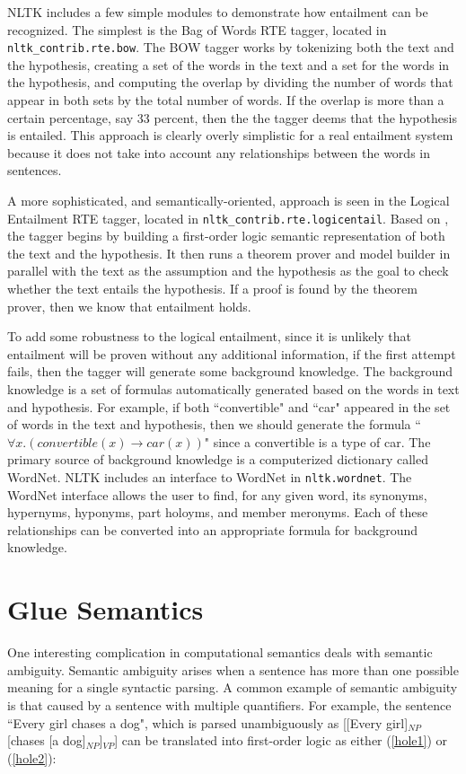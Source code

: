\documentclass{article}
\newcommand{\dhgcode}[1]{{\tt #1}}
\begin{document}
NLTK includes a few simple modules to demonstrate how entailment can be recognized.  The simplest is the Bag of Words RTE tagger, located in \dhgcode{nltk\_contrib.rte.bow}.  The BOW tagger works by tokenizing both the text and the hypothesis, creating a set of the words in the text and a set for the words in the hypothesis, and computing the overlap by dividing the number of words that appear in both sets by the total number of words.  If the overlap is more than a certain percentage, say 33 percent, then the the tagger deems that the hypothesis is entailed.  This approach is clearly overly simplistic for a real entailment system because it does not take into account any relationships between the words in sentences.

A more sophisticated, and semantically-oriented, approach is seen in the Logical Entailment RTE tagger, located in \dhgcode{nltk\_contrib.rte.logicentail}.  Based on \cite{BosRTE}, the tagger begins by building a first-order logic semantic representation of both the text and the hypothesis.  It then runs a theorem prover and model builder in parallel with the text as the assumption and the hypothesis as the goal to check whether the text entails the hypothesis.  If a proof is found by the theorem prover, then we know that entailment holds.

To add some robustness to the logical entailment, since it is unlikely that entailment will be proven without any additional information, if the first attempt fails, then the tagger will generate some background knowledge.  The background knowledge is a set of formulas automatically generated based on the words in text and hypothesis.  For example, if both ``convertible" and ``car" appeared in the set of words in the text and hypothesis, then we should generate the formula ``$\forall x.(convertible(x) \rightarrow car(x))$" since a convertible is a type of car.  The primary source of background knowledge is a computerized dictionary called WordNet.  NLTK includes an interface to WordNet in \dhgcode{nltk.wordnet}.  The WordNet interface allows the user to find, for any given word, its synonyms, hypernyms, hyponyms, part holoyms, and member meronyms.  Each of these relationships can be converted into an appropriate formula for background knowledge.


\section{Glue Semantics}
One interesting complication in computational semantics deals with semantic ambiguity.  Semantic ambiguity arises when a sentence has more than one possible meaning for a single syntactic parsing.  A common example of semantic ambiguity is that caused by a sentence with multiple quantifiers.  For example, the sentence ``Every girl chases a dog", which is parsed unambiguously as [[Every girl]$_{NP}$ [chases [a dog]$_{NP}$]$_{VP}$] can be translated into first-order logic as either (\ref{hole1}) or (\ref{hole2}):
\end{document}
